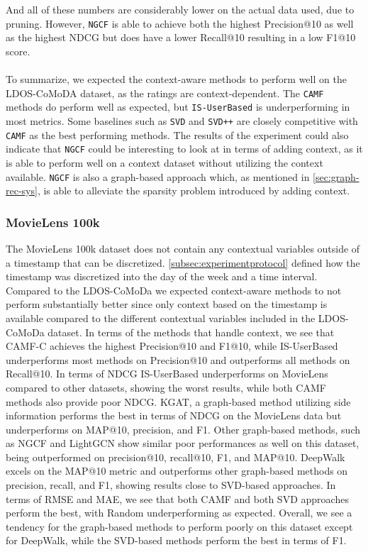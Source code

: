 And all of these numbers are considerably lower on the actual data used, due to pruning.
However, \texttt{NGCF} is able to achieve both the highest Precision@10 as well as the highest NDCG but does have a lower Recall@10 resulting in a low F1@10 score.
\\\\
To summarize, we expected the context-aware methods to perform well on the LDOS-CoMoDA dataset, as the ratings are context-dependent. 
The \texttt{CAMF} methods do perform well as expected, but \texttt{IS-UserBased} is underperforming in most metrics.
Some baselines such as \texttt{SVD} and \texttt{SVD++} are closely competitive with \texttt{CAMF} as the best performing methods.
The results of the experiment could also indicate that \texttt{NGCF} could be interesting to look at in terms of adding context, as it is able to perform well on a context dataset without utilizing the context available. 
\texttt{NGCF} is also a graph-based approach which, as mentioned in \autoref{sec:graph-rec-sys}, is able to alleviate the sparsity problem introduced by adding context.

\subsubsection{MovieLens 100k}
The MovieLens 100k dataset does not contain any contextual variables outside of a timestamp that can be discretized.
\autoref{subsec:experimentprotocol} defined how the timestamp was discretized into the day of the week and a time interval.
Compared to the LDOS-CoMoDa we expected context-aware methods to not perform substantially better since only context based on the timestamp is available compared to the different contextual variables included in the LDOS-CoMoDa dataset. 
In terms of the methods that handle context, we see that CAMF-C achieves the highest Precision@10 and F1@10, while IS-UserBased underperforms most methods on Precision@10 and outperforms all methods on Recall@10.
In terms of NDCG IS-UserBased underperforms on MovieLens compared to other datasets, showing the worst results, while both CAMF methods also provide poor NDCG.
KGAT, a graph-based method utilizing side information performs the best in terms of NDCG on the MovieLens data but underperforms on MAP@10, precision, and F1.
Other graph-based methods, such as NGCF and LightGCN show similar poor performances as well on this dataset, being outperformed on precision@10, recall@10, F1, and MAP@10.
DeepWalk excels on the MAP@10 metric and outperforms other graph-based methods on precision, recall, and F1, showing results close to SVD-based approaches.
In terms of RMSE and MAE, we see that both CAMF and both SVD approaches perform the best, with Random underperforming as expected.
Overall, we see a tendency for the graph-based methods to perform poorly on this dataset except for DeepWalk, while the SVD-based methods perform the best in terms of F1.

